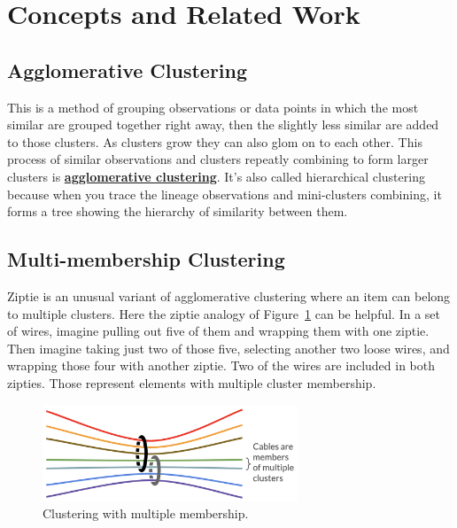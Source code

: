 \section{Concepts and Related Work}
\label{sec:background}

\subsection{Agglomerative Clustering}
\label{subsec:agglomeration}

This is a method of grouping observations or data points in which
the most similar are grouped together right away, then the slightly less
similar are added to those clusters. As clusters grow they can also glom on
to each other. This process of similar observations and clusters
repeatly combining to form larger clusters is
\textbf{\href{
https://en.wikipedia.org/w/index.php?title=Hierarchical_clustering&section=3
}{agglomerative clustering}}.
It's also called hierarchical clustering because when you trace the lineage
observations and mini-clusters combining, it forms a tree showing
the hierarchy of similarity between them. 

\subsection{Multi-membership Clustering}
\label{subsec:multimembership}

Ziptie is an unusual variant of agglomerative clustering where an item
can belong to multiple clusters. Here the ziptie analogy of
Figure~\ref{fig:multimember} can be helpful.
In a set of wires, imagine pulling out five of them and wrapping them
with one ziptie. Then imagine taking just two of those five, selecting another
two loose wires, and wrapping those four with another ziptie.
Two of the wires are included in both zipties. Those represent elements
with multiple cluster membership.

\begin{figure}[ht]
\vskip 0.0in
\begin{center}
\centerline{\includegraphics[width=3.0in]{images/multimember.png}}
\caption{Clustering with multiple membership.}
\label{fig:multimember}
\end{center}
\vskip -0.2in
\end{figure}

